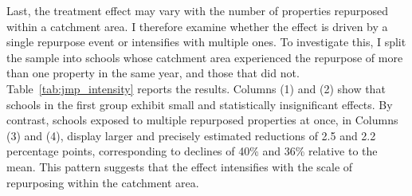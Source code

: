 \documentclass[12pt]{article}
\theoremstyle{plain}
\theoremstyle{plain}
\theoremstyle{plain}
\theoremstyle{definition}
\theoremstyle{plain}
\theoremstyle{definition}
\theoremstyle{plain}
\theoremstyle{remark}
\theoremstyle{definition}
\theoremstyle{definition}
\theoremstyle{plain}
\begin{document}
Last, the treatment effect may vary with the number of properties repurposed within a catchment area. I therefore examine whether the effect is driven by a single repurpose event or intensifies with multiple ones. To investigate this, I split the sample into schools whose catchment area experienced the repurpose of more than one property in the same year, and those that did not. Table~\ref{tab:jmp_intensity} reports the results. Columns (1) and (2) show that schools in the first group exhibit small and statistically insignificant effects. By contrast, schools exposed to multiple repurposed properties at once, in Columns (3) and (4), display larger and precisely estimated reductions of 2.5 and 2.2 percentage points, corresponding to declines of 40\% and 36\% relative to the mean. This pattern suggests that the effect intensifies with the scale of repurposing within the catchment area. \par
\medskip
\end{document}
